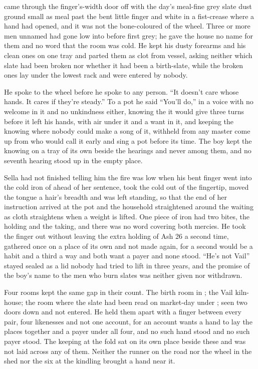 \scenebreak

 came through the finger's-width door off  with the day's meal-fine grey slate dust ground small as meal past the bent little finger and white in a fist-crease where a hand had opened, and it was not the bone-coloured  of the wheel. Three or more men unnamed had gone low into  before first grey; he gave the house no name for them and no word that the room was cold. He kept his dusty forearms and his clean ones on one tray and parted them as clot from vessel, asking neither which slate had been broken nor whether it had been a birth-slate, while the broken ones lay under the lowest rack and were entered by nobody.

He spoke to the wheel before he spoke to any person. “It doesn't care whose hands. It cares if they're steady.” To a pot he said “You'll do,” in a voice with no welcome in it and no unkindness either, knowing the  it would give three turns before it left his hands, with air under it and a want in it, and keeping the knowing where nobody could make a song of it, withheld from any master come up from  who would call it early and sing a pot before its time. The boy kept the knowing on a tray of its own beside the hearings and never among them, and no seventh hearing stood up in the empty place.

Sella had not finished telling him the fire was low when his bent finger went into the cold iron of  ahead of her sentence, took the cold out of the fingertip, moved the tongue a hair's breadth and was left standing, so that the end of her instruction arrived at the pot and the household straightened around the waiting as cloth straightens when a weight is lifted. One piece of iron had two bites, the holding and the taking, and there was no  word covering both mercies. He took the finger out without leaving the extra holding of Ash 26 a second time, gathered once on a place of its own and not made again, for a second would be a habit and a third a way and both want a payer and none stood. “He's not Vail” stayed sealed as a lid nobody had tried to lift in three years, and the promise of the boy's name to the men who burn slates was neither given nor withdrawn.

\scenebreak

Four rooms kept the same gap in their count. The birth room in ; the Vail kiln-house; the room where the slate had been read on market-day under ;  seen two doors down and not entered. He held them apart with a finger between every pair, four likenesses and not one account, for an account wants a hand to lay the places together and a payer under all four, and no such hand stood and no such payer stood. The keeping at the fold sat on its own place beside these and was not laid across any of them. Neither the runner on the road nor the wheel in the shed nor the six at the kindling brought a hand near it.

